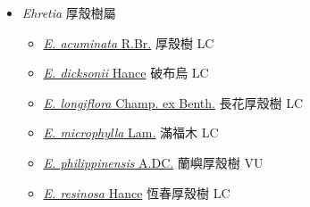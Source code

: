 
  \begin{itemize}
 \item[] \textit{Ehretia} 厚殼樹屬
                                
  \begin{itemize}
        \item[] \href{http://www.theplantlist.org/tpl1.1/search?q=Ehretia+acuminata}{\textit{E. acuminata} R.Br.}   厚殼樹   LC
        \item[] \href{http://www.theplantlist.org/tpl1.1/search?q=Ehretia+dicksonii}{\textit{E. dicksonii} Hance}   破布烏   LC
        \item[] \href{http://www.theplantlist.org/tpl1.1/search?q=Ehretia+longiflora}{\textit{E. longiflora} Champ. ex Benth.}   長花厚殼樹   LC
        \item[] \href{http://www.theplantlist.org/tpl1.1/search?q=Ehretia+microphylla}{\textit{E. microphylla} Lam.}   滿福木   LC
        \item[] \href{http://www.theplantlist.org/tpl1.1/search?q=Ehretia+philippinensis}{\textit{E. philippinensis} A.DC.}   蘭嶼厚殼樹   VU
        \item[] \href{http://www.theplantlist.org/tpl1.1/search?q=Ehretia+resinosa}{\textit{E. resinosa} Hance}   恆春厚殼樹   LC
  \end{itemize}
  \end{itemize}
